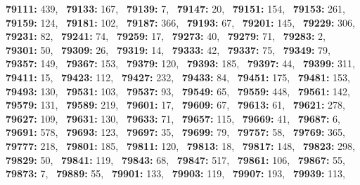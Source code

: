 \textbf{79111:} 439,\allowbreak~ 
\textbf{79133:} 167,\allowbreak~ 
\textbf{79139:} 7,\allowbreak~ 
\textbf{79147:} 20,\allowbreak~ 
\textbf{79151:} 154,\allowbreak~ 
\textbf{79153:} 261,\allowbreak~ 
\textbf{79159:} 124,\allowbreak~ 
\textbf{79181:} 102,\allowbreak~ 
\textbf{79187:} 366,\allowbreak~ 
\textbf{79193:} 67,\allowbreak~ 
\textbf{79201:} 145,\allowbreak~ 
\textbf{79229:} 306,\allowbreak~ 
\textbf{79231:} 82,\allowbreak~ 
\textbf{79241:} 74,\allowbreak~ 
\textbf{79259:} 17,\allowbreak~ 
\textbf{79273:} 40,\allowbreak~ 
\textbf{79279:} 71,\allowbreak~ 
\textbf{79283:} 2,\allowbreak~ 
\textbf{79301:} 50,\allowbreak~ 
\textbf{79309:} 26,\allowbreak~ 
\textbf{79319:} 14,\allowbreak~ 
\textbf{79333:} 42,\allowbreak~ 
\textbf{79337:} 75,\allowbreak~ 
\textbf{79349:} 79,\allowbreak~ 
\textbf{79357:} 149,\allowbreak~ 
\textbf{79367:} 153,\allowbreak~ 
\textbf{79379:} 120,\allowbreak~ 
\textbf{79393:} 185,\allowbreak~ 
\textbf{79397:} 44,\allowbreak~ 
\textbf{79399:} 311,\allowbreak~ 
\textbf{79411:} 15,\allowbreak~ 
\textbf{79423:} 112,\allowbreak~ 
\textbf{79427:} 232,\allowbreak~ 
\textbf{79433:} 84,\allowbreak~ 
\textbf{79451:} 175,\allowbreak~ 
\textbf{79481:} 153,\allowbreak~ 
\textbf{79493:} 130,\allowbreak~ 
\textbf{79531:} 103,\allowbreak~ 
\textbf{79537:} 93,\allowbreak~ 
\textbf{79549:} 65,\allowbreak~ 
\textbf{79559:} 448,\allowbreak~ 
\textbf{79561:} 142,\allowbreak~ 
\textbf{79579:} 131,\allowbreak~ 
\textbf{79589:} 219,\allowbreak~ 
\textbf{79601:} 17,\allowbreak~ 
\textbf{79609:} 67,\allowbreak~ 
\textbf{79613:} 61,\allowbreak~ 
\textbf{79621:} 278,\allowbreak~ 
\textbf{79627:} 109,\allowbreak~ 
\textbf{79631:} 130,\allowbreak~ 
\textbf{79633:} 71,\allowbreak~ 
\textbf{79657:} 115,\allowbreak~ 
\textbf{79669:} 41,\allowbreak~ 
\textbf{79687:} 6,\allowbreak~ 
\textbf{79691:} 578,\allowbreak~ 
\textbf{79693:} 123,\allowbreak~ 
\textbf{79697:} 35,\allowbreak~ 
\textbf{79699:} 79,\allowbreak~ 
\textbf{79757:} 58,\allowbreak~ 
\textbf{79769:} 365,\allowbreak~ 
\textbf{79777:} 218,\allowbreak~ 
\textbf{79801:} 185,\allowbreak~ 
\textbf{79811:} 120,\allowbreak~ 
\textbf{79813:} 18,\allowbreak~ 
\textbf{79817:} 148,\allowbreak~ 
\textbf{79823:} 298,\allowbreak~ 
\textbf{79829:} 50,\allowbreak~ 
\textbf{79841:} 119,\allowbreak~ 
\textbf{79843:} 68,\allowbreak~ 
\textbf{79847:} 517,\allowbreak~ 
\textbf{79861:} 106,\allowbreak~ 
\textbf{79867:} 55,\allowbreak~ 
\textbf{79873:} 7,\allowbreak~ 
\textbf{79889:} 55,\allowbreak~ 
\textbf{79901:} 133,\allowbreak~ 
\textbf{79903:} 119,\allowbreak~ 
\textbf{79907:} 193,\allowbreak~ 
\textbf{79939:} 113,\allowbreak~ 
